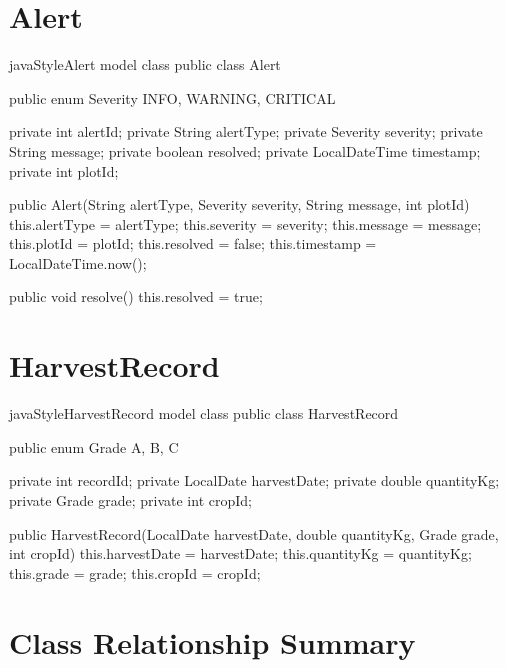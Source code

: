 \documentclass[12pt, a4paper]{report}
\begin{document}
\section{Alert}

\begin{codeblock}{javaStyle}{Alert model class}
public class Alert {
    public enum Severity { INFO, WARNING, CRITICAL }

    private int           alertId;
    private String        alertType;
    private Severity      severity;
    private String        message;
    private boolean       resolved;
    private LocalDateTime timestamp;
    private int           plotId;

    public Alert(String alertType, Severity severity, String message, int plotId) {
        this.alertType = alertType;
        this.severity  = severity;
        this.message   = message;
        this.plotId    = plotId;
        this.resolved  = false;
        this.timestamp = LocalDateTime.now();
    }

    public void resolve() {
        this.resolved = true;
    }
}
\end{codeblock}

\section{HarvestRecord}

\begin{codeblock}{javaStyle}{HarvestRecord model class}
public class HarvestRecord {
    public enum Grade { A, B, C }

    private int       recordId;
    private LocalDate harvestDate;
    private double    quantityKg;
    private Grade     grade;
    private int       cropId;

    public HarvestRecord(LocalDate harvestDate, double quantityKg,
                         Grade grade, int cropId) {
        this.harvestDate = harvestDate;
        this.quantityKg  = quantityKg;
        this.grade       = grade;
        this.cropId      = cropId;
    }
}
\end{codeblock}

\section{Class Relationship Summary}
\end{document}
